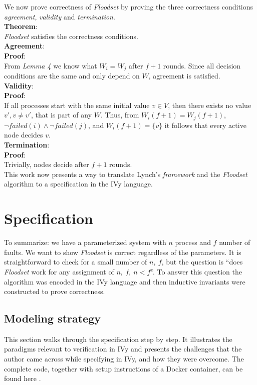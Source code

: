 \documentclass[fleqn]{article}
\begin{document}
\noindent We now prove correctness of \textit{Floodset} by proving the three correctness conditions \textit{agreement}, \textit{validity}
 and \textit{termination}. \\
\noindent \textbf{Theorem}:\\
\textit{Floodset} satisfies the correctness conditions.\\
\textbf{Agreement}:\\
\textbf{Proof}:\\
From \textit{Lemma 4} we know what $W_i = W_j$ after $f+1$ rounds. Since all decision conditions are the same and only depend on $W$, agreement is satisfied.\\
\textbf{Validity}:\\
\textbf{Proof}:\\
If all processes start with the same initial value $v \in V$, then there exists no value $v', v \neq v'$, that is part of any $W$. Thus, from $W_i(f+1) = W_j(f+1)$, $\neg failed(i) \land \neg failed(j)$, and $W_i(f+1) = \{v\}$ it follows
that every active node decides $v$.\\
\textbf{Termination}:\\
\textbf{Proof}:\\
Trivially, nodes decide after $f+1$ rounds.\\

This work now presents a way to translate Lynch's \textit{framework} and the \textit{Floodset} algorithm to a specification in the IVy language.

\section{Specification}
To summarize: we have a parameterized system with $n$ process and $f$ number of faults. We want to show \textit{Floodset} is correct regardless of the parameters.
It is straightforward to check for a small number of $n,\ f$, but the question is ``does \textit{Floodset} work for any assignment of $n,\ f,\ n < f$''.
To answer this question the algorithm was encoded in the IVy language and then inductive invariants were constructed to prove correctness.


\subsection{Modeling strategy}

This section walks through the specification step by step. It illustrates the paradigms relevant to verification in IVy and presents the challenges that the author came across while specifying in IVy, and how they were overcome. The complete code, together with setup instructions of a Docker container, can be found here \cite{github}.
\end{document}
